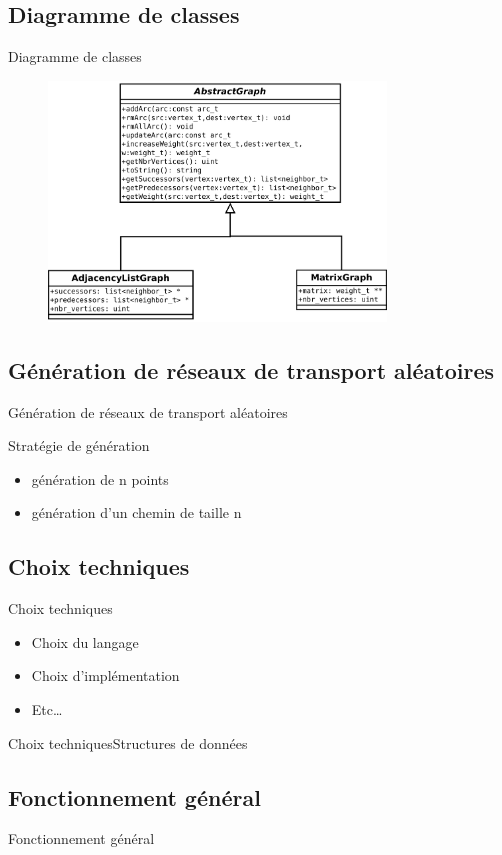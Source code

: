 \subsection{Diagramme de classes}
\begin{frame}{Diagramme de classes}
\begin{figure}
\includegraphics[width=0.8\textwidth]{img/diag_class.pdf}
\end{figure}
\end{frame}

\subsection{Génération de réseaux de transport aléatoires}
\begin{frame}{Génération de réseaux de transport aléatoires}
\begin{block}{Stratégie de génération}
  \begin{itemize}
    \item génération de n points
    \item génération d'un chemin de taille n
  \end{itemize}
\end{block}
\end{frame}

\subsection{Choix techniques}
\begin{frame}{Choix techniques}
\begin{itemize}
\item Choix du langage
\item Choix d'implémentation
\item Etc\ldots
\end{itemize}
\end{frame}


\begin{frame}{Choix techniques}{Structures de données}
\end{frame}

\subsection{Fonctionnement général}
\begin{frame}{Fonctionnement général}
\end{frame}